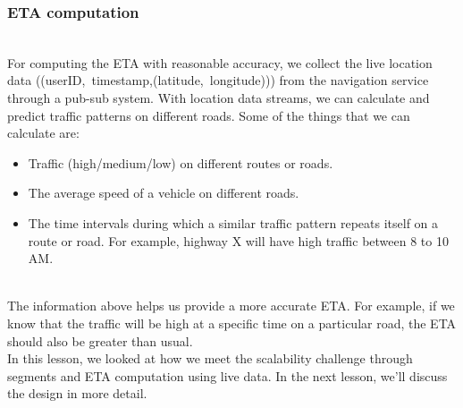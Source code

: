 \subsubsection{ETA computation}\label{6e-xFOcV1qVLXpD1xLZaN}
\\
For computing the ETA with reasonable accuracy, we collect the live location data ((userID,\ timestamp,(latitude,\ longitude))) from the navigation service through a pub-sub system. With location data streams, we can calculate and predict traffic patterns on different roads. Some of the things that we can calculate are:

\begin{itemize}
\item
\protect{}\label{C1apgQr9MX4jqo3mB0rDz}
Traffic (high/medium/low) on different routes or roads.
\item
\protect{}\label{ME_3B1avdGHW7yn7SaU9k}
The average speed of a vehicle on different roads.
\item
\protect{}\label{4uoyukmKbpEL1qgpt7LSO}
The time intervals during which a similar traffic pattern repeats itself on a route or road. For example, highway X will have high traffic between 8 to 10 AM.
\end{itemize}
\\
The information above helps us provide a more accurate ETA. For example, if we know that the traffic will be high at a specific time on a particular road, the ETA should also be greater than usual.
\\
In this lesson, we looked at how we meet the scalability challenge through segments and ETA computation using live data. In the next lesson, we'll discuss the design in more detail.

